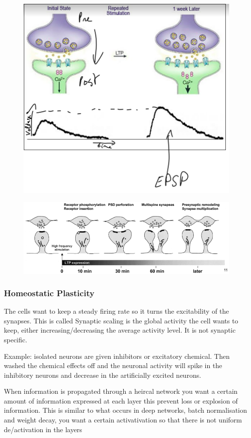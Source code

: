 \documentclass[main]{subfiles}
\begin{document}
\begin{figure}[H]
    \centering
    \includegraphics[width=.6\textwidth]{03_PlasticityInTheBrain/figures/pasted_image_1.png}
    \caption{}
    \label{fig:syn_plast1}
\end{figure}

\begin{figure}[H]
    \centering
    \includegraphics[width=.8\textwidth]{03_PlasticityInTheBrain/figures/pasted_image_2.png}
    \caption{}
    \label{fig:syn_plast1}
\end{figure}


\subsubsection{Homeostatic Plasticity}
The cells want to keep a steady firing rate so it turns the excitability of the synapses. This is called Synaptic scaling is the global activity the cell wants to keep, either increasing/decreasing the average activity level. It is not synaptic specific. 

Example: isolated neurons are given inhibitors or excitatory chemical. Then washed the chemical effects off and the neuronal activity will spike in the inhibitory neurons and decrease in the artificially excited neurons. 

When information is propagated through a heircal network you want a certain amount of information expressed at each layer this prevent loss or explosion of information. This is similar to what occurs in deep networks, batch normalisation and weight decay, you want a certain activativation so that there is not uniform de/activation in the layers 
\end{document}
